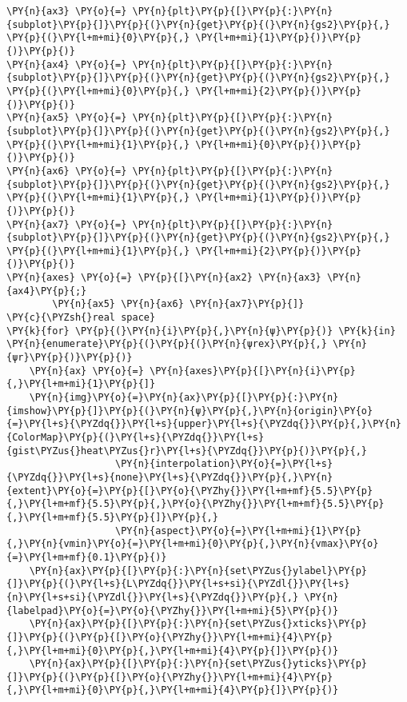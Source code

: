 \begin{Verbatim}[commandchars=\\\{\}]
\PY{n}{ax3} \PY{o}{=} \PY{n}{plt}\PY{p}{[}\PY{p}{:}\PY{n}{subplot}\PY{p}{]}\PY{p}{(}\PY{n}{get}\PY{p}{(}\PY{n}{gs2}\PY{p}{,} \PY{p}{(}\PY{l+m+mi}{0}\PY{p}{,} \PY{l+m+mi}{1}\PY{p}{)}\PY{p}{)}\PY{p}{)}
\PY{n}{ax4} \PY{o}{=} \PY{n}{plt}\PY{p}{[}\PY{p}{:}\PY{n}{subplot}\PY{p}{]}\PY{p}{(}\PY{n}{get}\PY{p}{(}\PY{n}{gs2}\PY{p}{,} \PY{p}{(}\PY{l+m+mi}{0}\PY{p}{,} \PY{l+m+mi}{2}\PY{p}{)}\PY{p}{)}\PY{p}{)}
\PY{n}{ax5} \PY{o}{=} \PY{n}{plt}\PY{p}{[}\PY{p}{:}\PY{n}{subplot}\PY{p}{]}\PY{p}{(}\PY{n}{get}\PY{p}{(}\PY{n}{gs2}\PY{p}{,} \PY{p}{(}\PY{l+m+mi}{1}\PY{p}{,} \PY{l+m+mi}{0}\PY{p}{)}\PY{p}{)}\PY{p}{)}
\PY{n}{ax6} \PY{o}{=} \PY{n}{plt}\PY{p}{[}\PY{p}{:}\PY{n}{subplot}\PY{p}{]}\PY{p}{(}\PY{n}{get}\PY{p}{(}\PY{n}{gs2}\PY{p}{,} \PY{p}{(}\PY{l+m+mi}{1}\PY{p}{,} \PY{l+m+mi}{1}\PY{p}{)}\PY{p}{)}\PY{p}{)}
\PY{n}{ax7} \PY{o}{=} \PY{n}{plt}\PY{p}{[}\PY{p}{:}\PY{n}{subplot}\PY{p}{]}\PY{p}{(}\PY{n}{get}\PY{p}{(}\PY{n}{gs2}\PY{p}{,} \PY{p}{(}\PY{l+m+mi}{1}\PY{p}{,} \PY{l+m+mi}{2}\PY{p}{)}\PY{p}{)}\PY{p}{)}
\PY{n}{axes} \PY{o}{=} \PY{p}{[}\PY{n}{ax2} \PY{n}{ax3} \PY{n}{ax4}\PY{p}{;}
        \PY{n}{ax5} \PY{n}{ax6} \PY{n}{ax7}\PY{p}{]}
\PY{c}{\PYZsh{}real space}
\PY{k}{for} \PY{p}{(}\PY{n}{i}\PY{p}{,}\PY{n}{ψ}\PY{p}{)} \PY{k}{in} \PY{n}{enumerate}\PY{p}{(}\PY{p}{(}\PY{n}{ψrex}\PY{p}{,} \PY{n}{ψr}\PY{p}{)}\PY{p}{)}
    \PY{n}{ax} \PY{o}{=} \PY{n}{axes}\PY{p}{[}\PY{n}{i}\PY{p}{,}\PY{l+m+mi}{1}\PY{p}{]}
    \PY{n}{img}\PY{o}{=}\PY{n}{ax}\PY{p}{[}\PY{p}{:}\PY{n}{imshow}\PY{p}{]}\PY{p}{(}\PY{n}{ψ}\PY{p}{,}\PY{n}{origin}\PY{o}{=}\PY{l+s}{\PYZdq{}}\PY{l+s}{upper}\PY{l+s}{\PYZdq{}}\PY{p}{,}\PY{n}{ColorMap}\PY{p}{(}\PY{l+s}{\PYZdq{}}\PY{l+s}{gist\PYZus{}heat\PYZus{}r}\PY{l+s}{\PYZdq{}}\PY{p}{)}\PY{p}{,}
                   \PY{n}{interpolation}\PY{o}{=}\PY{l+s}{\PYZdq{}}\PY{l+s}{none}\PY{l+s}{\PYZdq{}}\PY{p}{,}\PY{n}{extent}\PY{o}{=}\PY{p}{[}\PY{o}{\PYZhy{}}\PY{l+m+mf}{5.5}\PY{p}{,}\PY{l+m+mf}{5.5}\PY{p}{,}\PY{o}{\PYZhy{}}\PY{l+m+mf}{5.5}\PY{p}{,}\PY{l+m+mf}{5.5}\PY{p}{]}\PY{p}{,}
                   \PY{n}{aspect}\PY{o}{=}\PY{l+m+mi}{1}\PY{p}{,}\PY{n}{vmin}\PY{o}{=}\PY{l+m+mi}{0}\PY{p}{,}\PY{n}{vmax}\PY{o}{=}\PY{l+m+mf}{0.1}\PY{p}{)}
    \PY{n}{ax}\PY{p}{[}\PY{p}{:}\PY{n}{set\PYZus{}ylabel}\PY{p}{]}\PY{p}{(}\PY{l+s}{L\PYZdq{}}\PY{l+s+si}{\PYZdl{}}\PY{l+s}{n}\PY{l+s+si}{\PYZdl{}}\PY{l+s}{\PYZdq{}}\PY{p}{,} \PY{n}{labelpad}\PY{o}{=}\PY{o}{\PYZhy{}}\PY{l+m+mi}{5}\PY{p}{)}
    \PY{n}{ax}\PY{p}{[}\PY{p}{:}\PY{n}{set\PYZus{}xticks}\PY{p}{]}\PY{p}{(}\PY{p}{[}\PY{o}{\PYZhy{}}\PY{l+m+mi}{4}\PY{p}{,}\PY{l+m+mi}{0}\PY{p}{,}\PY{l+m+mi}{4}\PY{p}{]}\PY{p}{)}
    \PY{n}{ax}\PY{p}{[}\PY{p}{:}\PY{n}{set\PYZus{}yticks}\PY{p}{]}\PY{p}{(}\PY{p}{[}\PY{o}{\PYZhy{}}\PY{l+m+mi}{4}\PY{p}{,}\PY{l+m+mi}{0}\PY{p}{,}\PY{l+m+mi}{4}\PY{p}{]}\PY{p}{)}

\end{Verbatim}
